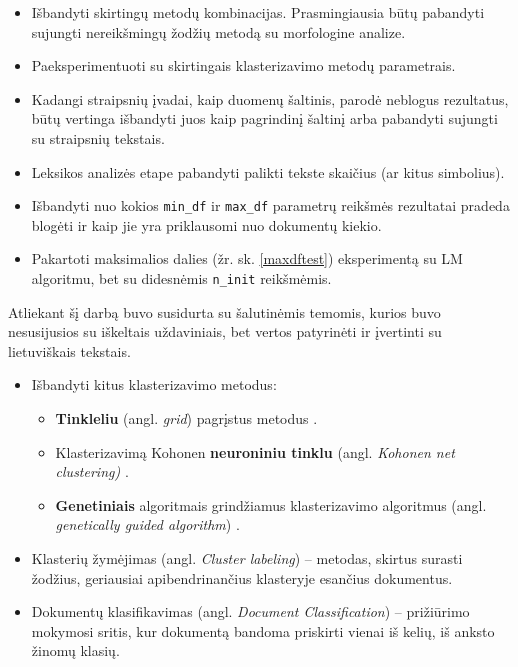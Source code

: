 \documentclass{VUMIFInfBakalaurinis}
\providecommand{\tightlist}{%
	  \setlength{\itemsep}{0pt}\setlength{\parskip}{0pt}}
\begin{document}
\begin{itemize}
\tightlist
\item
  Išbandyti skirtingų metodų kombinacijas. Prasmingiausia būtų pabandyti
  sujungti nereikšmingų žodžių metodą su morfologine analize.
\item
  Paeksperimentuoti su skirtingais klasterizavimo metodų parametrais.
\item
  Kadangi straipsnių įvadai, kaip duomenų šaltinis, parodė neblogus
  rezultatus, būtų vertinga išbandyti juos kaip pagrindinį šaltinį arba
  pabandyti sujungti su straipsnių tekstais.
\item
  Leksikos analizės etape pabandyti palikti tekste skaičius (ar kitus
  simbolius).
\item
  Išbandyti nuo kokios \texttt{min\_df} ir \texttt{max\_df} parametrų reikšmės rezultatai
  pradeda blogėti ir kaip jie yra priklausomi nuo dokumentų kiekio.
\item
  Pakartoti maksimalios dalies (žr. sk. \ref{maxdftest}) eksperimentą su LM
  algoritmu, bet su didesnėmis \texttt{n\_init} reikšmėmis.
\end{itemize}

Atliekant šį darbą buvo susidurta su šalutinėmis temomis, kurios buvo
nesusijusios su iškeltais uždaviniais, bet vertos patyrinėti ir
įvertinti su lietuviškais tekstais.

\begin{itemize}
\tightlist
\item
  Išbandyti kitus klasterizavimo metodus:

  \begin{itemize}
  \item
    \textbf{Tinkleliu} (angl. \emph{grid}) pagrįstus metodus \cite{mivm2010}.
  \item
    Klasterizavimą Kohonen \textbf{neuroniniu tinklu} (angl.
    \emph{Kohonen net clustering)} \cite{kohonen2007kohonen}.
  \item
    \textbf{Genetiniais} algoritmais grindžiamus klasterizavimo
    algoritmus (angl. \emph{genetically guided algorithm}) \cite{hall1999clustering}.
  \end{itemize}
\item
  Klasterių žymėjimas (angl. \emph{Cluster labeling}) -- metodas,
  skirtus surasti žodžius, geriausiai apibendrinančius klasteryje
  esančius dokumentus.
\item
  Dokumentų klasifikavimas (angl. \emph{Document Classification}) --
  prižiūrimo mokymosi sritis, kur dokumentą bandoma priskirti vienai iš
  kelių, iš anksto žinomų klasių.
\end{itemize}
\end{document}
